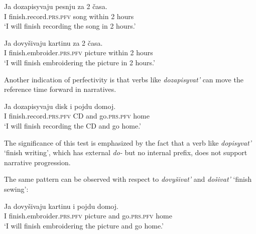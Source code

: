 \documentclass[output=paper,
colorlinks,
citecolor=brown,
newtxmath
]{langscibook}
\begin{document}
\z

\ea\label{songpfin2}
\gll Ja dozapisyvaju pesnju za 2 časa.\\
I {finish.record.}\textsc{prs.pfv} song within 2 hours\\
\trans `I will finish recording the song in 2 hours.'
\z

\ea\label{songpfin3}
\gll Ja dovyšivaju kartinu za 2 časa.\\
I {finish.embroider.}\textsc{prs.pfv} picture within 2 hours\\
\glt `I will finish embroidering the picture in 2 hours.'
\z

\noindent Another indication of perfectivity is that verbs like \textit{dozapisyvat'} can move the reference time forward in narratives.

\ea\label{songpfnarr1}
\gll Ja dozapisyvaju disk i pojdu domoj.\\
I {finish.record.}\textsc{prs.pfv} CD and go.\textsc{prs.pfv} home\\
\glt `I will finish recording the CD and go home.' \hfill \citep[32]{Zinova2016}
\z

\noindent The significance of this test is emphasized by the fact that a verb like \textit{dopisyvat'} `finish writing', which has external \textit{do-} but no internal prefix, does not support narrative progression.

\z

\noindent The same pattern can be observed with respect to \textit{dovyšivat'} and \textit{došivat'} `finish sewing':

\ea\label{kartpfnarr0}
\gll Ja dovyšivaju kartinu i pojdu domoj.\\
I {finish.embroider.}\textsc{prs.pfv} picture and go.\textsc{prs.pfv} home\\
\glt `I will finish embroidering the picture and go home.'
\z

\z
\end{document}
